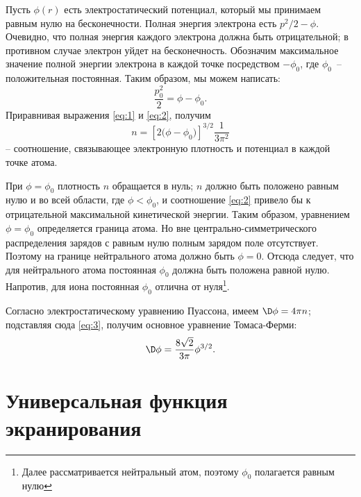   Пусть \( \phi(r) \) есть электростатический потенциал, который мы принимаем
  равным нулю на бесконечности. Полная энергия электрона есть
  \( p^2 / 2 - \phi \). Очевидно, что полная энергия каждого электрона должна
  быть отрицательной; в противном случае электрон уйдет на бесконечность.
  Обозначим максимальное значение полной энергии электрона в каждой точке
  посредством \( -\phi_0 \), где \( \phi_0 \)~-- положительная постоянная.
  Таким образом, мы можем написать:
  \begin{equation}
    \frac{p_0^2}{2} = \phi - \phi_0.
    \label{eq:2}
  \end{equation}
  Приравнивая выражения \eqref{eq:1} и \eqref{eq:2}, получим
  \begin{equation}
    n = \left[ 2\bigl(\phi - \phi_0\big) \right]^{3 / 2} \frac{1}{3\pi^2}
    \label{eq:3}
  \end{equation}
  -- соотношение, связывающее электронную плотность и потенциал в каждой точке
  атома.

  При \( \phi = \phi_0 \) плотность \( n \) обращается в нуль; \( n \) должно
  быть положено равным нулю и во всей области, где \( \phi < \phi_0 \), и
  соотношение \eqref{eq:2} привело бы к отрицательной максимальной
  кинетической энергии. Таким образом, уравнением \( \phi = \phi_0 \)
  определяется граница атома. Но вне центрально-симметрического распределения
  зарядов с равным нулю полным зарядом поле отсутствует. Поэтому на границе
  нейтрального атома должно быть \( \phi = 0 \). Отсюда следует, что для
  нейтрального атома постоянная \( \phi_0 \) должна быть положена равной нулю.
  Напротив, для иона постоянная \( \phi_0 \) отлична от нуля\footnote{ Далее
  рассматривается нейтральный атом, поэтому \( \phi_0 \) полагается равным
  нулю}.

  Согласно электростатическому уравнению Пуассона, имеем \( \D\phi = 4\pi n \);
  подставляя сюда \eqref{eq:3}, получим основное уравнение Томаса-Ферми:
  \begin{equation}
    \D\phi = \frac{8\sqrt{2}}{3\pi}\phi^{3 / 2}.
    \label{eq:4}
  \end{equation}

  \section{Универсальная функция экранирования}


